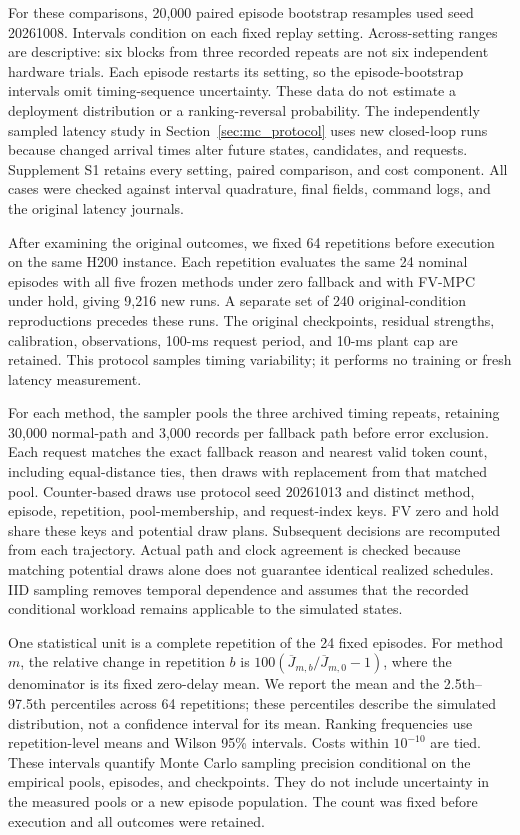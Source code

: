For these comparisons, 20,000 paired episode bootstrap resamples used seed 20261008. Intervals condition on each fixed replay setting. Across-setting ranges are descriptive: six blocks from three recorded repeats are not six independent hardware trials. Each episode restarts its setting, so the episode-bootstrap intervals omit timing-sequence uncertainty. These data do not estimate a deployment distribution or a ranking-reversal probability. The independently sampled latency study in Section~\ref{sec:mc_protocol} uses new closed-loop runs because changed arrival times alter future states, candidates, and requests. Supplement S1 retains every setting, paired comparison, and cost component. All cases were checked against interval quadrature, final fields, command logs, and the original latency journals.



\label{sec:mc_protocol}

After examining the original outcomes, we fixed 64 repetitions before execution on the same H200 instance. Each repetition evaluates the same 24 nominal episodes with all five frozen methods under zero fallback and with FV-MPC under hold, giving 9,216 new runs. A separate set of 240 original-condition reproductions precedes these runs. The original checkpoints, residual strengths, calibration, observations, 100-ms request period, and 10-ms plant cap are retained. This protocol samples timing variability; it performs no training or fresh latency measurement.

For each method, the sampler pools the three archived timing repeats, retaining 30,000 normal-path and 3,000 records per fallback path before error exclusion. Each request matches the exact fallback reason and nearest valid token count, including equal-distance ties, then draws with replacement from that matched pool. Counter-based draws use protocol seed 20261013 and distinct method, episode, repetition, pool-membership, and request-index keys. FV zero and hold share these keys and potential draw plans. Subsequent decisions are recomputed from each trajectory. Actual path and clock agreement is checked because matching potential draws alone does not guarantee identical realized schedules. IID sampling removes temporal dependence and assumes that the recorded conditional workload remains applicable to the simulated states.

One statistical unit is a complete repetition of the 24 fixed episodes. For method $m$, the relative change in repetition $b$ is $100(\overline J_{m,b}/\overline J_{m,0}-1)$, where the denominator is its fixed zero-delay mean. We report the mean and the 2.5th--97.5th percentiles across 64 repetitions; these percentiles describe the simulated distribution, not a confidence interval for its mean. Ranking frequencies use repetition-level means and Wilson 95\% intervals. Costs within $10^{-10}$ are tied. These intervals quantify Monte Carlo sampling precision conditional on the empirical pools, episodes, and checkpoints. They do not include uncertainty in the measured pools or a new episode population. The count was fixed before execution and all outcomes were retained.

